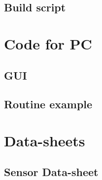 \documentclass[12pt,a4paper]{article}
\begin{document}
\subsection{Build script}


\section{Code for PC}
\subsection{GUI}

\subsection{Routine example}

\section{Data-sheets}
\subsection{Sensor Data-sheet }\label{app:PMW3660}

%
\end{document}

